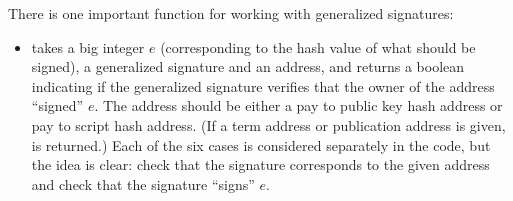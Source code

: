 There is one important function for working with generalized signatures:
\begin{itemize}
\item {} takes a big integer $e$ (corresponding to the hash value
of what should be signed), a generalized signature
and an address, and returns a boolean indicating if the generalized signature
verifies that the owner of the address ``signed'' $e$.
The address should be either a pay to public key hash address or pay to script hash address.
(If a term address or publication address is given, {} is returned.)
Each of the six cases is considered separately in the code, but the idea is clear:
check that the signature corresponds to the given address and
check that the signature ``signs'' $e$.
\end{itemize}
